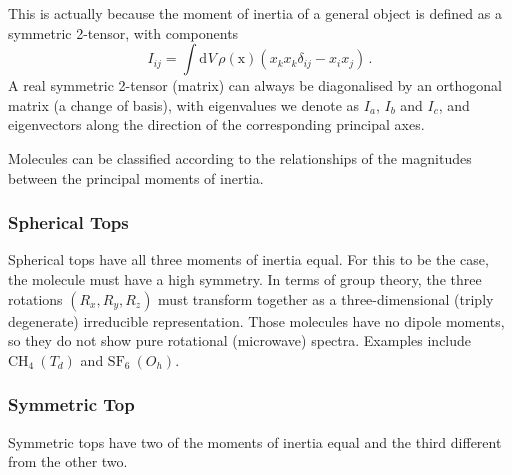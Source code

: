 \documentclass{article}
\theoremstyle{plain}\theoremheaderfont{\normalfont\itshape}\theorembodyfont{\rmfamily}\theoremseparator{.}\newtheorem*{rem}{Remark}\newtheorem*{ex}{Example}\newtheorem*{proof}{Proof}\newtheorem*{altp}{Alternative proof}
\theoremstyle{plain}\theoremheaderfont{\normalfont\bfseries}\theorembodyfont{\rmfamily}\theoremseparator{.}\newtheorem{thm}{Theorem}[section]\newtheorem{lem}[thm]{Lemma}\newtheorem{prop}[thm]{Proposition}\newtheorem*{cor}{Corollary}\newtheorem{defn}[thm]{Definition}\newtheorem{clm}[thm]{Claim}\newtheorem{clminproof}{Claim}\newtheorem{pos}{Postulate}[section]
\theoremstyle{break}\theoremheaderfont{\normalfont\itshape}\theorembodyfont{\rmfamily}\theoremseparator{.\medskip}\newtheorem*{proofskip}{Proof}\newtheorem*{exs}{Examples}\newtheorem*{rems}{Remarks}
\theoremstyle{break}\theoremheaderfont{\normalfont\bfseries}\theorembodyfont{\rmfamily}\theoremseparator{.\medskip}\newtheorem{lemskip}[thm]{Lemma}\newtheorem{defnskip}[thm]{Definition}\newtheorem{propskip}[thm]{Proposition}\newtheorem{thmskip}[thm]{Theorem}
\numberwithin{equation}{section}
\newcommand{\dd}[2][]{\mathrm{d}^{#1} #2\,}
\newcommand{\vb}[1]{\bm{\mathrm{#1}}}
\begin{document}
    This is actually because the moment of inertia of a general object is defined as a symmetric 2-tensor, with components
    \begin{equation}
        I_{ij}=\int\dd{V}\rho(\vb{x})(x_kx_k\delta_{ij}-x_ix_j)\,.
    \end{equation}
    A real symmetric 2-tensor (matrix) can always be diagonalised by an orthogonal matrix (a change of basis), with eigenvalues we denote as \(I_a\), \(I_b\) and \(I_c\), and eigenvectors along the direction of the corresponding principal axes.

    Molecules can be classified according to the relationships of the magnitudes between the principal moments of inertia.

    \subsubsection{Spherical Tops}
    Spherical tops have all three moments of inertia equal. For this to be the case, the molecule must have a high symmetry. In terms of group theory, the three rotations \((R_x, R_y, R_z)\) must transform together as a three-dimensional (triply degenerate) irreducible representation. Those molecules have no dipole moments, so they do not show pure rotational (microwave) spectra. Examples include \(\mathrm{CH_4}\ (T_d)\) and \(\mathrm{SF_6}\ (O_h)\).
    \subsubsection{Symmetric Top}
    Symmetric tops have two of the moments of inertia equal and the third different from the other two.
    \begin{figure}[ht!]
        \centering
    \end{figure}
\end{document}

